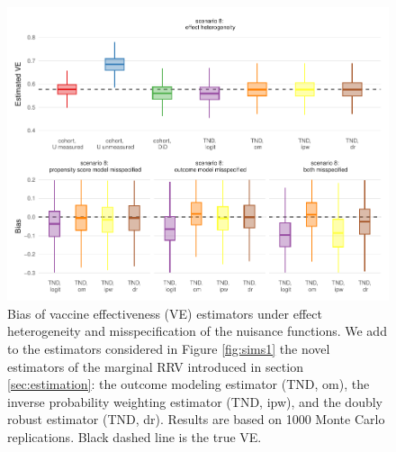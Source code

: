 \documentclass[11pt]{article}
\begin{document}
\begin{figure}
    \centering
    \includegraphics{../results/sims2.pdf}
    \caption{Bias of vaccine effectiveness (VE) estimators under effect heterogeneity and misspecification of the nuisance functions. We add to the estimators considered in Figure \ref{fig:sims1} the novel estimators of the marginal RRV introduced in section \ref{sec:estimation}: the outcome modeling estimator (TND, om), the inverse probability weighting estimator (TND, ipw), and the doubly robust estimator (TND, dr). Results are based on 1000 Monte Carlo replications. Black dashed line is the true VE.}
    \label{fig:sims2}
\end{figure}



\clearpage



\end{document}
